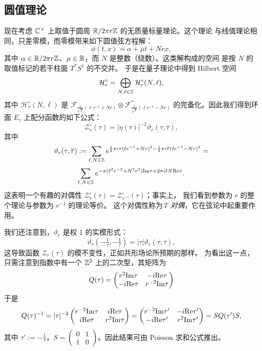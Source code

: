 \subsection{圆值理论} 

现在考虑 $\Bbb C^\times$ 上取值于圆周 $\Bbb R/2\pi r\Bbb Z$ 的无质量标量理论。这个理论
与线值理论相同，只差零模，而零模带来如下圆值弦方程解：
$$
\phi(t,x)=\alpha+\mu t+Nrx,
$$
其中 $\alpha\in \Bbb R/2\pi r\Bbb Z$、$\mu\in \Bbb R$，而
$N$ 是整数（绕数）。这类解构成的空间
是按 $N$ 的取值标记的若干柱面 $T^*S^1$ 的不交并。
于是在量子理论中得到 Hilbert 空间
$$
\mathcal H_r^\circ=\bigoplus_{N,\ell\in \Bbb Z}\mathcal H_r^\circ(N,\ell), 
$$
其中
$\mathcal H_r^\circ(N,\ell)$ 是
$\mathcal F_{\frac{1}{\sqrt{2}}(\ell r^{-1}+Nr)}\otimes \mathcal F_{\frac{1}{\sqrt{2}}(\ell r^{-1}-Nr)}^*$ 的完备化。因此我们得到环面 $E_\tau$ 上配分函数的如下公式：
$$
\mathcal Z_r^\circ(\tau)=|\eta(\tau)|^{-2}\vartheta_r(\tau,\overline \tau),
$$
其中
$$
\vartheta_r(\tau,\overline \tau):=\sum_{\ell,N\in \Bbb Z}e^{\frac{1}{2}\pi i\tau (\ell r^{-1}+Nr)^2-\frac{1}{2}\pi i\overline \tau (\ell r^{-1}-Nr)^2}=
$$
$$
\sum_{\ell,N\in \Bbb Z}e^{-\pi (\ell^2 r^{-2}+N^2r^2){\rm Im}\tau+2\pi i\ell N {\rm Re}\tau}.
$$
这表明一个有趣的对偶性 $\mathcal Z_r^\circ(\tau)=\mathcal Z_{r^{-1}}^\circ(\tau)$；事实上，
我们看到参数为 $r$ 的整个理论与参数为 $r^{-1}$ 的理论等价。
这个对偶性称为\emph{T 对偶}，它在弦论中起重要作用。

我们还注意到，$\vartheta_r$ 是权 $1$ 的实模形式：
$$
\vartheta_r(-\tfrac{1}{\tau},-\tfrac{1}{\overline \tau})=|\tau| \vartheta_r(\tau,\overline \tau),
$$
这导致函数 $\mathcal Z_r(\tau)$ 的模不变性，正如共形场论所预期的那样。
为看出这一点，只需注意到指数中有一个 $\Bbb Z^2$ 上的二次型，其矩阵为
$$
Q(\tau)=\begin{pmatrix} r^2{\rm Im\tau} & -i{\rm Re}\tau\\  -i{\rm Re \tau} & r^{-2}{\rm Im \tau}\end{pmatrix} 
$$
于是
$$
Q(\tau)^{-1}=|\tau|^{-2}\begin{pmatrix} r^{-2}{\rm Im\tau} & i{\rm Re}\tau\\  i{\rm Re \tau} & r^{2}{\rm Im \tau}\end{pmatrix}=
\begin{pmatrix} r^{-2}{\rm Im\tau'} & -i{\rm Re}\tau'\\  -i{\rm Re \tau'} & r^{2}{\rm Im \tau'}\end{pmatrix}=SQ(\tau')S,
$$
其中 $\tau':=-\frac{1}{\tau}$，$S=\begin{pmatrix} 0& 1\\ 1& 0\end{pmatrix}$。因此结果可由 Poisson 求和公式推出。

